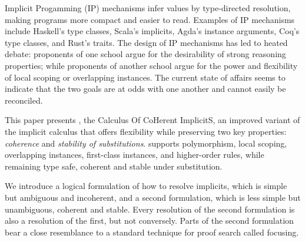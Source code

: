 Implicit Progamming (IP) mechanisms infer values by type-directed
resolution, making programs more compact and easier to read.
Examples of IP mechanisms include Haskell's type classes, Scala's
implicits, Agda's instance arguments, Coq's type classes, and Rust's
traits.  The design of IP mechanisms has led to heated debate:
proponents of one school argue for the desirability of strong
reasoning properties; while proponents of another
school argue for the power and flexibility of local scoping or
overlapping instances.  The current state of affairs seems to indicate that
the two goals are at odds with one another and cannot easily be
reconciled.

This paper presents \name, the Calculus Of CoHerent ImplicitS,
an improved variant of the implicit calculus that offers flexibility
while preserving two key properties: \emph{coherence} and
\emph{stability of substitutions}. \name supports
polymorphism, local scoping,
overlapping instances, first-class instances, and higher-order
rules, while remaining type safe, coherent and stable under substitution.

We introduce a logical formulation of how to resolve implicits, which
is simple but ambiguous and incoherent, and a second formulation,
which is less simple but unambiguous, coherent and stable.  Every resolution
of the second formulation is also a resolution of the first, but not
conversely.  Parts of the second formulation bear a close resemblance
to a standard technique for proof search called focusing.





